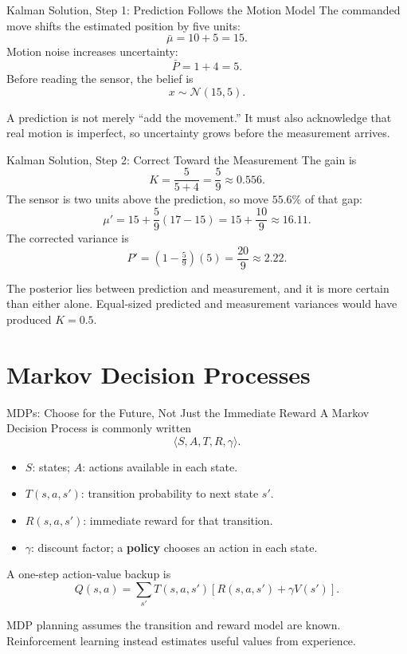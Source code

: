 \documentclass[aspectratio=169,10pt]{beamer}
\begin{document}
\begin{frame}{Kalman Solution, Step 1: Prediction Follows the Motion Model}
  The commanded move shifts the estimated position by five units:
  \[
    \bar\mu=10+5=15.
  \]
  Motion noise increases uncertainty:
  \[
    \bar P=1+4=5.
  \]
  Before reading the sensor, the belief is
  \[
    x\sim\mathcal{N}(15,5).
  \]
  \begin{keyidea}
    A prediction is not merely ``add the movement.'' It must also acknowledge that real motion is imperfect, so uncertainty grows before the measurement arrives.
  \end{keyidea}
\end{frame}

\begin{frame}{Kalman Solution, Step 2: Correct Toward the Measurement}
  \small
  The gain is
  \[
    K=\frac{5}{5+4}=\frac{5}{9}\approx0.556.
  \]
  The sensor is two units above the prediction, so move $55.6\%$ of that gap:
  \[
    \mu'=15+\frac{5}{9}(17-15)
         =15+\frac{10}{9}
         \approx16.11.
  \]
  The corrected variance is
  \[
    P'=(1-\tfrac{5}{9})(5)=\frac{20}{9}\approx2.22.
  \]
  \begin{keyidea}
    The posterior lies between prediction and measurement, and it is more certain than either alone. Equal-sized predicted and measurement variances would have produced $K=0.5$.
  \end{keyidea}
\end{frame}

\section{Markov Decision Processes}

\begin{frame}{MDPs: Choose for the Future, Not Just the Immediate Reward}
  A Markov Decision Process is commonly written
  \[
    \langle S,A,T,R,\gamma\rangle.
  \]
  \begin{itemize}
    \item $S$: states; $A$: actions available in each state.
    \item $T(s,a,s')$: transition probability to next state $s'$.
    \item $R(s,a,s')$: immediate reward for that transition.
    \item $\gamma$: discount factor; a \textbf{policy} chooses an action in each state.
  \end{itemize}
  A one-step action-value backup is
  \[
    Q(s,a)=\sum_{s'}T(s,a,s')\left[R(s,a,s')+\gamma V(s')\right].
  \]
  \begin{keyidea}
    MDP planning assumes the transition and reward model are known. Reinforcement learning instead estimates useful values from experience.
  \end{keyidea}
\end{frame}
\end{document}
